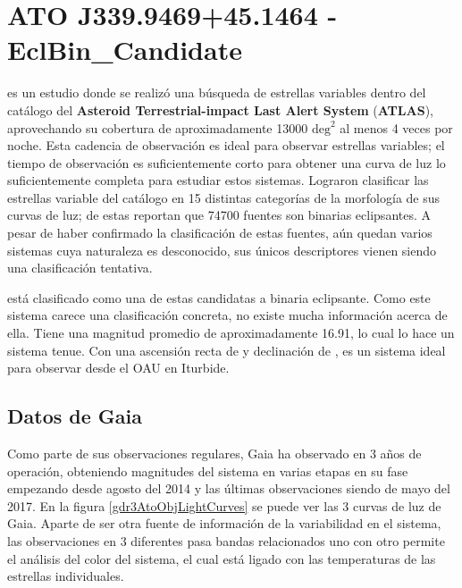 \section{ATO J339.9469+45.1464 - EclBin\_Candidate}

\citet{atlasATOObjectDiscovery} es un estudio donde se realizó una búsqueda de
estrellas variables dentro del catálogo del \textbf{Asteroid Terrestrial-impact
Last Alert System} (\textbf{ATLAS}), aprovechando su cobertura de
aproximadamente \num{13000} $\mathrm{deg}^2$ al menos 4 veces por noche. Esta
cadencia de observación es ideal para observar estrellas variables; el tiempo de
observación es suficientemente corto para obtener una curva de luz lo
suficientemente completa para estudiar estos sistemas. Lograron clasificar las
estrellas variable del catálogo en 15 distintas categorías de la morfología de
sus curvas de luz; de estas reportan que \num{74700} fuentes son binarias
eclipsantes. A pesar de haber confirmado la clasificación de estas fuentes, aún
quedan varios sistemas cuya naturaleza es desconocido, sus únicos descriptores
vienen siendo una clasificación tentativa.

\textbf{\atoObjId} está clasificado como una de estas candidatas a binaria
eclipsante. Como este sistema carece una clasificación concreta, no existe mucha
información acerca de ella. Tiene una magnitud promedio de aproximadamente
\num{16.91}, lo cual lo hace un sistema tenue. Con una ascensión recta de
 y declinación de , \textbf{\atoObjId}
es un sistema ideal para observar desde el OAU en Iturbide.

\newpage

\subsection{Datos de Gaia}

Como parte de sus observaciones regulares, Gaia ha observado \atoObjId en 3 años
de operación, obteniendo magnitudes del sistema en varias etapas en su fase
empezando desde agosto del 2014 y las últimas observaciones siendo de mayo del
2017. En la figura \ref{gdr3AtoObjLightCurves} se puede ver las 3 curvas de luz
de Gaia. Aparte de ser otra fuente de información de la variabilidad en el
sistema, las observaciones en 3 diferentes pasa bandas relacionados uno con otro
permite el análisis del color del sistema, el cual está ligado con las
temperaturas de las estrellas individuales.

